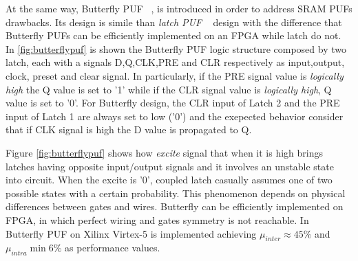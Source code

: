 \documentclass[../tesi.tex]{subfiles}
\begin{document}
At the same way, Butterfly PUF ~\cite{kumar2008butterfly}, is introduced in order to address SRAM PUFs drawbacks. Its design is simile than \emph{latch PUF} ~\cite{su2008digital} design with the difference that Butterfly PUFs can be efficiently implemented on an FPGA while latch  do not. In \ref{fig:butterflypuf} is shown the Butterfly PUF logic structure composed by two latch, each with a signals D,Q,CLK,PRE and CLR respectively as input,output, clock, preset and clear signal. In particularly, if the PRE signal value is \emph{logically high} the Q value is set to '1' while if the CLR signal value is \emph{logically high}, Q value is set to '0'. 
For Butterfly \puf{} design, the CLR input of Latch 2 and the PRE input of Latch 1 are always set to low ('0') and  the exepected behavior consider that if CLK signal is high the D value is propagated to Q. 
 
Figure \ref{fig:butterflypuf} shows how \emph{excite} signal that when it is high brings latches having opposite input/output signals and it involves an unstable state into circuit.
When the excite is '0', coupled latch casually assumes one of two possible states with a certain probability. This phenomenon depends on physical differences between gates and wires. 
Butterfly \puf{} can be efficiently implemented on FPGA, in which perfect wiring and gates  symmetry is not reachable.
In ~\cite{kumar2008butterfly} Butterfly PUF on Xilinx Virtex-5 is implemented achieving $\mu_{inter} \approx 45\%$ and $\mu_{intra} \min 6\%$ as performance values.
\end{document}
